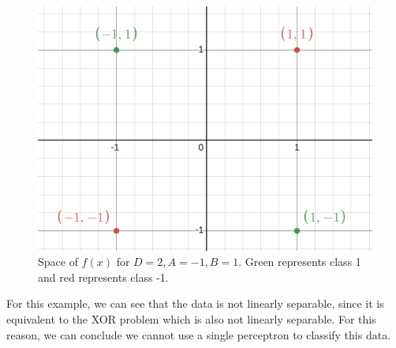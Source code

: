 \documentclass[12pt]{article}
\begin{document}
\begin{itemize}
    \begin{figure}[H]
        \centering
        \includegraphics[width=0.5\linewidth]{../outputs/hw1-q3-a.png}
        \caption{Space of $f(x)$ for $D=2, A=-1, B=1$. Green represents class 1 and red represents class -1.}
        \label{fig:3a:graph}
    \end{figure}

    For this example, we can see that the data is not linearly separable, since it is equivalent to the XOR problem which is also not linearly separable. For this reason, we can conclude we cannot use a single perceptron to classify this data.

\end{itemize}
\end{document}
